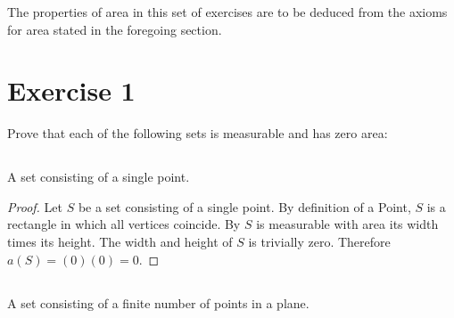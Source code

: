 \documentclass{article}
\begin{document}

The properties of area in this set of exercises are to be deduced from the
  axioms for area stated in the foregoing section.

\section*{Exercise 1}%
%

Prove that each of the following sets is measurable and has zero area:

\subsection*{}%
%

A set consisting of a single point.

\begin{proof}

  Let $S$ be a set consisting of a single point.
  By definition of a Point, $S$ is a rectangle in which all vertices coincide.
  By  $S$ is measurable with area its width times
    its height.
  The width and height of $S$ is trivially zero.
  Therefore $a(S) = (0)(0) = 0$.

\end{proof}

\subsection*{}%
%

A set consisting of a finite number of points in a plane.
\end{document}

